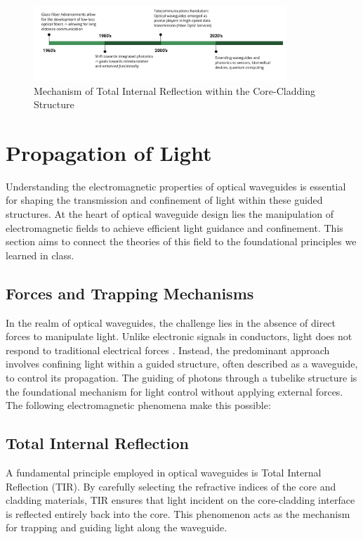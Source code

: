 \documentclass[10pt]{article}
\begin{document}
\begin{figure}[h]
    \centering
    \includegraphics[width = 9.5cm]{Timeline.png}
    \caption{Mechanism of Total Internal Reflection within the Core-Cladding Structure} 
    \end{figure}



\section{Propagation of Light}

Understanding the electromagnetic properties of optical waveguides is essential for 
shaping the transmission and confinement of light within these guided structures. 
At the heart of optical waveguide design lies the manipulation of electromagnetic 
fields to achieve efficient light guidance and confinement. This section aims to connect the 
theories of this field to the foundational principles we learned in class.

\subsection{Forces and Trapping Mechanisms}

In the realm of optical waveguides, the challenge lies in the absence of direct forces to manipulate light. 
Unlike electronic signals in conductors, light does not respond to traditional electrical forces \cite{ref02}.
Instead, the predominant approach involves confining light within a guided structure, often described as a waveguide, 
to control its propagation. The guiding of photons through a tubelike structure is the foundational mechanism for light control without 
applying external forces. The following electromagnetic phenomena make this possible:

\subsection{Total Internal Reflection}
A fundamental principle employed in optical waveguides is Total Internal Reflection (TIR). By carefully selecting the refractive indices of the core and cladding materials, TIR ensures that light incident on the core-cladding interface is reflected entirely back into the core. This phenomenon acts as the mechanism for trapping and guiding light along the waveguide.
\end{document}

